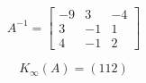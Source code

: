 \[
A^{-1}=\left[
\begin{array}{ccc}
-9 & 3 & -4 \\
3 & -1 & 1\\
4 & -1 & 2
\end{array}\right]
\]
\bigskip

\[
  K_\infty (A)= \left(
  112 \right)
\]
